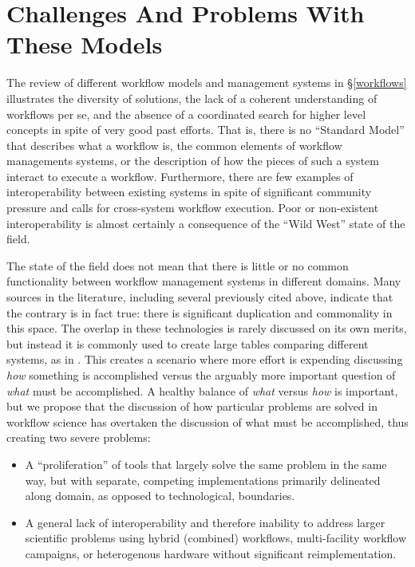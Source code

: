 \section{Challenges And Problems With These Models}\label{commonFunc}

The review of different workflow models and management systems in \S\ref{workflows} illustrates the
diversity of solutions, the lack of a coherent understanding of workflows per se, and the absence of a coordinated search for higher level concepts in spite of very good past efforts. That is, there is no ``Standard Model'' that describes what a workflow is, the common elements of workflow managements systems, or the description of how the pieces of such a system interact to execute a workflow. Furthermore, there are few examples of interoperability between existing systems in spite of significant community pressure and calls for cross-system workflow execution. Poor or non-existent interoperability is almost certainly a consequence of the ``Wild West'' state of the field.

The state of the field does not mean that there is little or no common functionality between workflow management systems in different domains. Many sources in the literature, including several previously cited above, indicate that the contrary is in fact true: there is significant duplication and commonality in this space. The overlap in these technologies is rarely discussed on its own merits, but instead it is commonly used to create large tables comparing different systems, as in \cite{ferreira_da_silva_characterization_nodate}. This creates a scenario where more effort is expending discussing \textit{how} something is accomplished versus the arguably more important question of \textit{what} must be accomplished. A healthy balance of \textit{what} versus \textit{how} is important, but we propose that the discussion of how particular problems are solved in workflow science has overtaken the discussion of what must be accomplished, thus creating two severe problems:
\begin{itemize}
\item A ``proliferation'' of tools that largely solve the same problem in the same way, but with separate, competing implementations primarily delineated along domain, as opposed to technological, boundaries.
\item A general lack of interoperability and therefore inability to address larger scientific problems using hybrid (combined) workflows, multi-facility workflow campaigns, or heterogenous hardware without significant reimplementation.
\end{itemize}

